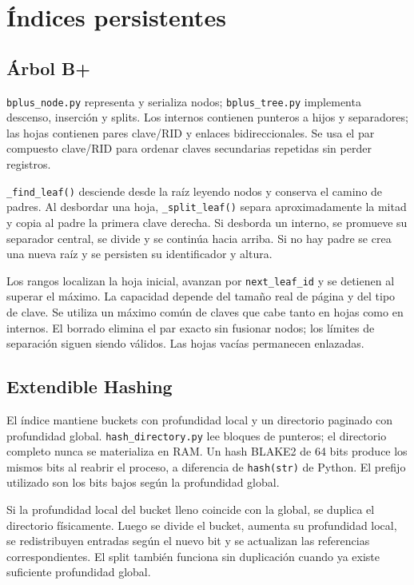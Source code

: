 \section{Índices persistentes}
\subsection{Árbol B+}
\texttt{bplus\_node.py} representa y serializa nodos; \texttt{bplus\_tree.py} implementa descenso, inserción y splits. Los internos contienen punteros a hijos y separadores; las hojas contienen pares clave/RID y enlaces bidireccionales. Se usa el par compuesto clave/RID para ordenar claves secundarias repetidas sin perder registros.

\texttt{\_find\_leaf()} desciende desde la raíz leyendo nodos y conserva el camino de padres. Al desbordar una hoja, \texttt{\_split\_leaf()} separa aproximadamente la mitad y copia al padre la primera clave derecha. Si desborda un interno, se promueve su separador central, se divide y se continúa hacia arriba. Si no hay padre se crea una nueva raíz y se persisten su identificador y altura.

Los rangos localizan la hoja inicial, avanzan por \texttt{next\_leaf\_id} y se detienen al superar el máximo. La capacidad depende del tamaño real de página y del tipo de clave. Se utiliza un máximo común de claves que cabe tanto en hojas como en internos. El borrado elimina el par exacto sin fusionar nodos; los límites de separación siguen siendo válidos. Las hojas vacías permanecen enlazadas.

\subsection{Extendible Hashing}
El índice mantiene buckets con profundidad local y un directorio paginado con profundidad global. \texttt{hash\_directory.py} lee bloques de punteros; el directorio completo nunca se materializa en RAM. Un hash BLAKE2 de 64 bits produce los mismos bits al reabrir el proceso, a diferencia de \texttt{hash(str)} de Python. El prefijo utilizado son los bits bajos según la profundidad global.

Si la profundidad local del bucket lleno coincide con la global, se duplica el directorio físicamente. Luego se divide el bucket, aumenta su profundidad local, se redistribuyen entradas según el nuevo bit y se actualizan las referencias correspondientes. El split también funciona sin duplicación cuando ya existe suficiente profundidad global.

